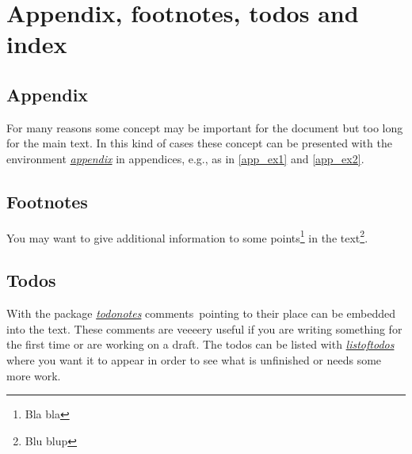 \documentclass[a4paper,11pt,oneside]{book}
\newcommand{\imp}[1]{\underline{\textit{#1}}}
\begin{document}

\chapter{Appendix, footnotes, todos and index}


\section{Appendix}

For many reasons some concept may be important for the document but too long for the main text. In this kind of cases these concept can be presented with the environment \imp{appendix} in appendices, e.g., as in \autoref{app_ex1} and \autoref{app_ex2}.


\section{Footnotes}

You may want to give additional information to some points\footnote{Bla bla} in the text\footnote{Blu blup}.


\section{Todos}

With the package \imp{todonotes} comments\ pointing to their place can be embedded into the text. These comments are veeeery useful if you are writing something for the first time or are working on a draft. The todos can be listed with \imp{listoftodos} where you want it to appear in order to see what is unfinished or needs some more work.

\end{document}
